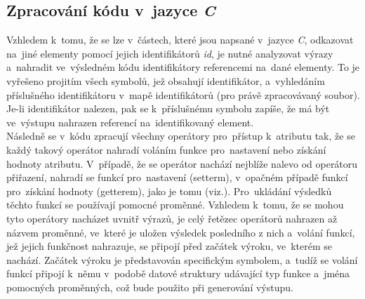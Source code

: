 \documentclass[11pt,twoside,a4paper]{book}
\begin{document}
\subsection{Zpracování kódu v~jazyce \textit{C}}
Vzhledem k~tomu, že se lze v~částech, které jsou napsané v~jazyce \textit{C}, odkazovat na~jiné elementy pomocí jejich identifikátorů \textit{id}, je nutné analyzovat výrazy a~nahradit ve~výsledném kódu identifikátory referencemi na~dané elementy. To je vyřešeno projitím všech symbolů, jež obsahují identifikátor, a~vyhledáním příslušného identifikátoru v~mapě identifikátorů (pro právě zpracovávaný soubor). Je-li identifikátor nalezen, pak se k~příslušnému symbolu zapíše, že má být ve~výstupu nahrazen referencí na~identifikovaný element.\\
Následně se v~kódu zpracují všechny operátory  pro~přístup k~atributu tak, že se každý takový operátor nahradí voláním funkce pro~nastavení nebo získání hodnoty atributu. V~případě, že se operátor  nachází nejblíže nalevo od operátoru přiřazení, nahradí se funkcí pro~nastavení (setterm), v~opačném případě funkcí pro~získání hodnoty (getterem), jako je tomu (viz.). Pro~ukládání výsledků těchto funkcí se používají pomocné proměnné. Vzhledem k~tomu, že se mohou tyto operátory nacházet uvnitř výrazů, je celý řetězec operátorů  nahrazen až názvem proměnné, ve~které je uložen výsledek posledního z nich a~volání funkcí, jež jejich funkčnost nahrazuje, se připojí před začátek výroku, ve~kterém se nachází. Začátek výroku je představován specifickým symbolem, a~tudíž se volání funkcí připojí k~němu v~podobě datové struktury udávající typ funkce a~jména pomocných proměnných, což bude použito při generování výstupu.
\end{document}
